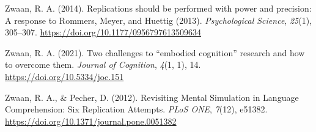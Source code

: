 \documentclass[
  12pt,
  man,floatsintext]{apa7}
\newlength{\cslhangindent}
\newlength{\cslentryspacingunit} %
\newenvironment{CSLReferences}[2] %
 {%
  \setlength{\parindent}{0pt}
  \ifodd #1
  \let\oldpar\par
  \def\par{\hangindent=\cslhangindent\oldpar}
  \fi
  \setlength{\parskip}{#2\cslentryspacingunit}
 }%
 {}
\begin{document}
\begin{CSLReferences}{1}{0}
\leavevmode{}%
Zwaan, R. A. (2014). Replications should be performed with power and precision: {A} response to {Rommers}, {Meyer}, and {Huettig} (2013). \emph{Psychological Science}, \emph{25}(1), 305--307. \url{https://doi.org/10.1177/0956797613509634}

\leavevmode{}%
Zwaan, R. A. (2021). Two challenges to {``embodied cognition''} research and how to overcome them. \emph{Journal of Cognition}, \emph{4}(1, 1), 14. \url{https://doi.org/10.5334/joc.151}

\leavevmode{}%
Zwaan, R. A., \& Pecher, D. (2012). Revisiting {Mental Simulation} in {Language Comprehension}: {Six Replication Attempts}. \emph{PLoS ONE}, \emph{7}(12), e51382. \url{https://doi.org/10.1371/journal.pone.0051382}

\end{CSLReferences}
\end{document}
